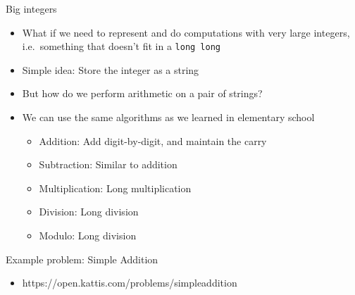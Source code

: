 \documentclass[10pt]{beamer}
\newcommand{\bi}{\begin{itemize}}
\newcommand{\ei}{\end{itemize}}
\begin{document}

\begin{frame}{Big integers}
    \bi
        \item What if we need to represent and do computations with very large integers, i.e.\ something that doesn't fit in a \texttt{long long}

        \vspace{5pt}
        \item Simple idea: Store the integer as a string
        \vspace{5pt}
        \item But how do we perform arithmetic on a pair of strings?
        \item We can use the same algorithms as we learned in elementary school
            \bi
                \item Addition: Add digit-by-digit, and maintain the carry
                \item Subtraction: Similar to addition
                \item Multiplication: Long multiplication
                \item Division: Long division
                \item Modulo: Long division
            \ei
    \ei
\end{frame}

\begin{frame}{Example problem: Simple Addition}
    \bi
        \item https://open.kattis.com/problems/simpleaddition
    \ei
\end{frame}

\end{document}
